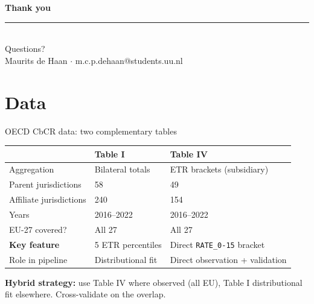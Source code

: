 \documentclass[aspectratio=169, 11pt]{beamer}
\newcommand{\highlight}[1]{\textcolor{DkOrange}{\textbf{#1}}}
\begin{document}
{
\begin{frame}[plain]
  \vspace{2.5em}
  \begin{center}
    {\color{Ivory}\Large\bfseries Thank you}\\[1.2em]
    {\color{DkOrange}\rule{4cm}{2pt}}\\[1.2em]
    {\color{WarmGrey}\normalsize Questions?}\\[2.0em]
    {\color{MidGrey}\small Maurits de Haan $\cdot$ m.c.p.dehaan@students.uu.nl}
  \end{center}
\end{frame}
}

\section{Data}

\begin{frame}{OECD CbCR data: two complementary tables}
\begin{center}
\small
\begin{tabular}{@{}L{3.5cm}C{4.0cm}C{4.0cm}@{}}
  \toprule
  & \textbf{Table I} & \textbf{Table IV} \\
  \midrule
  Aggregation & Bilateral totals & ETR brackets (subsidiary) \\
  Parent jurisdictions & 58 & 49 \\
  Affiliate jurisdictions & 240 & 154 \\
  Years & 2016--2022 & 2016--2022 \\
  EU-27 covered? & All 27 & All 27 \\[4pt]
  \highlight{Key feature} & 5 ETR percentiles & Direct \texttt{RATE\_0-15} bracket \\[4pt]
  Role in pipeline & Distributional fit & Direct observation + validation \\
  \bottomrule
\end{tabular}
\end{center}

\vspace{0.5em}
\textbf{Hybrid strategy:} use Table IV where observed (all EU), Table I distributional fit elsewhere. Cross-validate on the overlap.
\end{frame}
\end{document}
